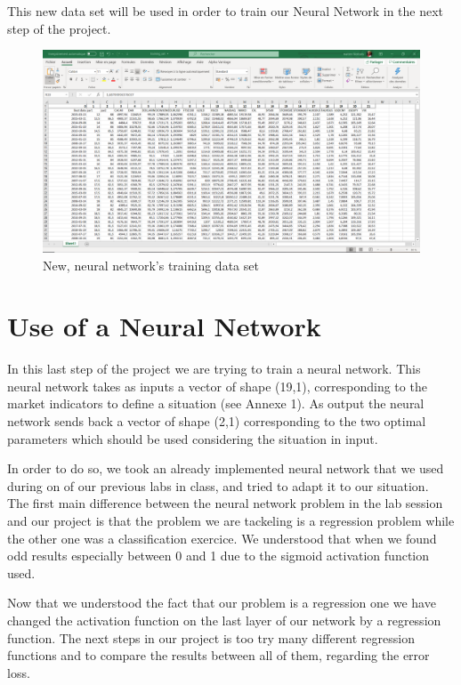 \documentclass[]{article}
\begin{document}
\vskip 0.5cm
This new data set will be used in order to train our Neural Network in the next step of the project. 

\begin{figure}[hbt!]
	\center{}
	\includegraphics[scale=0.15]{image/training_set.png}
	\caption{New, neural network's training data set}
\end{figure}


\section{Use of a Neural Network}
\vskip 0.5cm
In this last step of the project we are trying to train a neural network. This neural network takes as inputs a vector of shape (19,1), corresponding to the market indicators to define a situation (see Annexe 1). As output the neural network sends back a vector of shape (2,1) corresponding to the two optimal parameters which should be used considering the situation in input.

\vskip 0.5cm
In order to do so, we took an already implemented neural network that we used during on of our previous labs in class, and tried to adapt it to our situation. \\
The first main difference between the neural network problem in the lab session and our project is that the problem we are tackeling is a regression problem while the other one was a classification exercice. We understood that when we found odd results especially between 0 and 1 due to the sigmoid activation function used.

\vskip 0.5cm
Now that we understood the fact that our problem is a regression one we have changed the activation function on the last layer of our network by a regression function. The next steps in our project is too try many different regression functions and to compare the results between all of them, regarding the error loss. 
\end{document}
